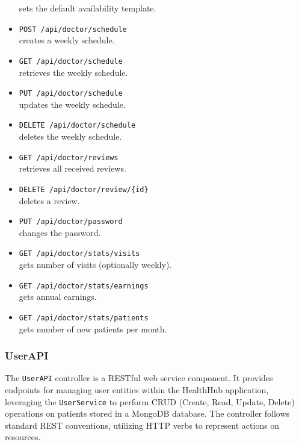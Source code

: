 \begin{itemize}
	sets the default availability template.
	\item \texttt{POST /api/doctor/schedule} \\
	creates a weekly schedule.
	\item \texttt{GET /api/doctor/schedule} \\
	retrieves the weekly schedule.
	\item \texttt{PUT /api/doctor/schedule} \\
	updates the weekly schedule.
	\item \texttt{DELETE /api/doctor/schedule} \\
	deletes the weekly schedule.
	\item \texttt{GET /api/doctor/reviews} \\
	retrieves all received reviews.
	\item \texttt{DELETE /api/doctor/review/\{id\}} \\
	 deletes a review.
	\item \texttt{PUT /api/doctor/password} \\
	 changes the password.
	\item \texttt{GET /api/doctor/stats/visits}\\
	gets number of visits (optionally weekly).
	\item \texttt{GET /api/doctor/stats/earnings}\\
	 gets annual earnings.
	\item \texttt{GET /api/doctor/stats/patients} \\
	gets number of new patients per month.
\end{itemize}

\subsubsection{UserAPI}
The \texttt{UserAPI} controller is a RESTful web service component. It provides endpoints for managing user entities within the HealthHub application, leveraging the \texttt{UserService} to perform CRUD (Create, Read, Update, Delete) operations on patients stored in a MongoDB database. The controller follows standard REST conventions, utilizing HTTP verbs to represent actions on resources. 

